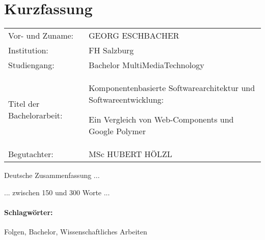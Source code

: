 \section*{Kurzfassung}
\begin{tabular}{p{4cm} p{12cm}}
Vor- und Zuname:& GEORG ESCHBACHER\\
Institution: & FH Salzburg\\
Studiengang: &  Bachelor MultiMediaTechnology\\
Titel der Bachelorarbeit: & Komponentenbasierte Softwarearchitektur und Softwareentwicklung: \par Ein Vergleich von Web-Components und Google Polymer\\
Begutachter: & MSc HUBERT HÖLZL\\
\end{tabular}
\vspace{0.5cm}

Deutsche Zusammenfassung ...

... zwischen 150 und 300 Worte ...

\paragraph{Schlagwörter:}
Folgen, Bachelor, Wissenschaftliches Arbeiten
